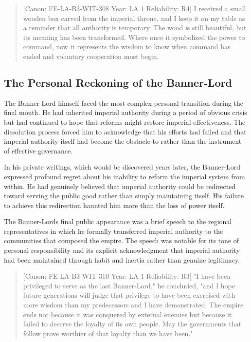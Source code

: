 \begin{quote}
{[}Canon: FE-LA-B3-WIT-308 \textbar{} Year: LA 1 \textbar{} Reliability:
R4{]} I received a small wooden box carved from the imperial throne, and
I keep it on my table as a reminder that all authority is temporary. The
wood is still beautiful, but its meaning has been transformed. Where
once it symbolized the power to command, now it represents the wisdom to
know when command has ended and voluntary cooperation must begin.
\end{quote}

\subsection{The Personal Reckoning of the
Banner-Lord}\label{the-personal-reckoning-of-the-banner-lord}

The Banner-Lord himself faced the most complex personal transition
during the final month. He had inherited imperial authority during a
period of obvious crisis but had continued to hope that reforms might
restore imperial effectiveness. The dissolution process forced him to
acknowledge that his efforts had failed and that imperial authority
itself had become the obstacle to rather than the instrument of
effective governance.

In his private writings, which would be discovered years later, the
Banner-Lord expressed profound regret about his inability to reform the
imperial system from within. He had genuinely believed that imperial
authority could be redirected toward serving the public good rather than
simply maintaining itself. His failure to achieve this redirection
haunted him more than the loss of power itself.

The Banner-Lord\textquotesingle s final public appearance was a brief
speech to the regional representatives in which he formally transferred
imperial authority to the communities that composed the empire. The
speech was notable for its tone of personal responsibility and its
explicit acknowledgment that imperial authority had been maintained
through habit and inertia rather than genuine legitimacy.

\begin{quote}
{[}Canon: FE-LA-B3-WIT-310 \textbar{} Year: LA 1 \textbar{} Reliability:
R3{]} "I have been privileged to serve as the last Banner-Lord," he
concluded, "and I hope future generations will judge that privilege to
have been exercised with more wisdom than my predecessors and I have
demonstrated. The empire ends not because it was conquered by external
enemies but because it failed to deserve the loyalty of its own people.
May the governments that follow prove worthier of that loyalty than we
have been."
\end{quote}

